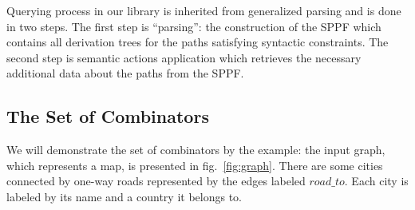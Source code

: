 
Querying process in our library is inherited from generalized parsing and is done in two steps.
The first step is ``parsing'': the construction of the SPPF which contains all derivation trees for the paths satisfying syntactic constraints.
The second step is semantic actions application which retrieves the necessary additional data about the paths from the SPPF.

\subsection{The Set of Combinators}

We will demonstrate the set of combinators by the example: the input graph, which represents a map, is presented in fig.~\ref{fig:graph}.
There are some cities connected by one-way roads represented by the edges labeled $road\_to$.
Each city is labeled by its name and a country it belongs to.

